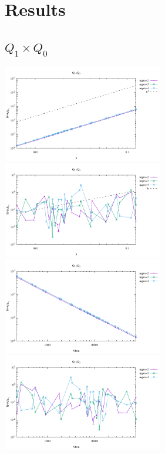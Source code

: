 \newpage
\section*{Results}

\subsection*{$Q_1\times Q_0$}

\begin{center}
\includegraphics[width=7cm]{python_codes/fieldstone_120/results/Q1Q0-velocity-h.pdf}
\includegraphics[width=7cm]{python_codes/fieldstone_120/results/Q1Q0-pressure-h.pdf}\\
\includegraphics[width=7cm]{python_codes/fieldstone_120/results/Q1Q0-velocity-Nfem.pdf}
\includegraphics[width=7cm]{python_codes/fieldstone_120/results/Q1Q0-pressure-Nfem.pdf}
\end{center}


